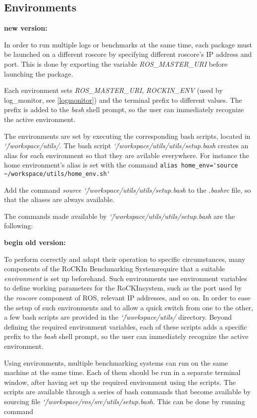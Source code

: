 \documentclass[a4paper]{article}
\newcommand{\ro}{RoCKIn}
\newcommand{\rbs}{RoCKIn Benchmarking System}
\newcommand{\srcdir}{\char`\~/workspace/ros/src/}
\newcommand{\toolsdir}{\char`\~/workspace/utils/}
\begin{document}
\subsection{Environments}
\label{sec:environments}

\textbf{new version:}

In order to run multiple logs or benchmarks at the same time, each package must be launched on a different roscore by specifying different roscore's IP address and port.
This is done by exporting the variable \textit{ROS\_MASTER\_URI} before launching the package.

Each environment sets \textit{ROS\_MASTER\_URI}, \textit{ROCKIN\_ENV} (used by log\_monitor, see \ref{logmonitor}) and the terminal prefix to different values.
The prefix is added to the \textit{bash} shell prompt, so the user can immediately recognize the active environment.

The environments are set by executing the corresponding bash scripts, located in \emph{\toolsdir}.
The bash script \emph{\toolsdir utils/setup.bash} creates an alias for each environment so that they are avilable everywhere. For instance the home environment's alias is set with the command
\verb|alias home_env='source ~/workspace/utils/home_env.sh'|

Add the command
\emph{source \toolsdir utils/setup.bash}
to the \emph{.bashrc} file, so that the aliases are always available.

The commands made available by \emph{\toolsdir utils/setup.bash} are the following:



\textbf{ begin old version: }

To perform correctly and adapt their operation to specific circumstances, many components of the \rbs require that a suitable \textit{environment} is set up beforehand. Such environments use environment variables to define working parameters for the \ro system, such as the port used by the \textit{roscore} component of ROS, relevant IP addresses, and so on. In order to ease the setup of such environments and to allow a quick switch from one to the other, a few bash scripts are provided in the \emph{\toolsdir} directory. Beyond defining the required environment variables, each of these scripts adds a specific prefix to the \textit{bash} shell prompt, so the user can immediately recognize the active environment.

Using environments, multiple benchmarking systems can run on the same machine at the same time. Each of them should be run in a separate terminal window, after having set up the required environment using the scripts. The scripts are available through a series of bash commands that become available by sourcing file \emph{\srcdir utils/setup.bash}. This can be done by running command 
\end{document}
